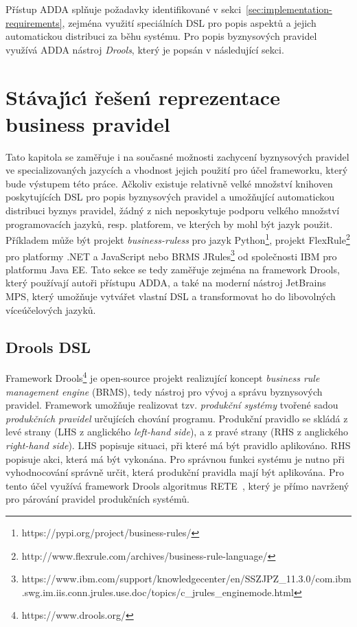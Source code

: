 Přístup \gls{ADDA} splňuje požadavky identifikované v sekci~\ref{sec:implementation-requirements},
zejména využití speciálních \gls{DSL} pro popis aspektů a
jejich automatickou distribuci za běhu systému. Pro popis byznysových pravidel
využívá \gls{ADDA} nástroj \textit{Drools}, který je popsán v následující sekci.

\section{Stávaj\'{\i}c\'{\i} řešen\'{\i} reprezentace business pravidel}\label{sec:business-rule-dsl}

Tato kapitola se zaměřuje i na současné možnosti zachycení
byznysových pravidel ve specializovaných jazycích a vhodnost jejich použití
pro účel frameworku, který bude výstupem této práce.
Ačkoliv existuje relativně velké množství knihoven poskytujících
\gls{DSL} pro popis byznysových pravidel a umožňující automatickou
distribuci byznys pravidel, žádný z nich neposkytuje podporu velkého
množství programovacích jazyků, resp. platforem, ve kterých by mohl
být jazyk použit. Příkladem může být projekt \textit{business-ruless}
pro jazyk Python\footnote{https://pypi.org/project/business-rules/}, projekt FlexRule\footnote{http://www.flexrule.com/archives/business-rule-language/} pro platformy .NET a
JavaScript nebo \gls{BRMS} JRules\footnote{https://www.ibm.com/support/knowledgecenter/en/SSZJPZ\_11.3.0/com.ibm.swg.im.iis.conn.jrules.use.doc/topics/c\_jrules\_enginemode.html} od společnosti IBM pro platformu \gls{Java EE}.
Tato sekce se tedy zaměřuje zejména na framework Drools, který
používají autoři přístupu \gls{ADDA}, a také na moderní nástroj
JetBrains MPS, který umožňuje vytvářet vlastní \gls{DSL} a transformovat
ho do libovolných víceúčelových jazyků.

\subsection{Drools DSL}

Framework Drools\footnote{https://www.drools.org/} je open-source projekt realizující koncept
\textit{business rule management engine} (\gls{BRMS}), tedy nástroj pro vývoj a správu byznysových
pravidel. Framework umožňuje realizovat tzv. \textit{produkční systémy} tvořené sadou \textit{produkčních pravidel}
určujících chování programu. Produkční pravidlo se skládá z levé strany (\gls{LHS} z anglického \textit{left-hand side}),
a z pravé strany (\gls{RHS} z anglického \textit{right-hand side}).
\gls{LHS} popisuje situaci, při které má být pravidlo aplikováno. \gls{RHS} popisuje akci,
která má být vykonána. Pro správnou funkci systému je nutno při vyhodnocování správně určit, která produkční pravidla
mají být aplikována. Pro tento účel využívá framework Drools algoritmus RETE~\cite{forgy1988rete},
který je přímo navržený pro párování pravidel produkčních systémů.

